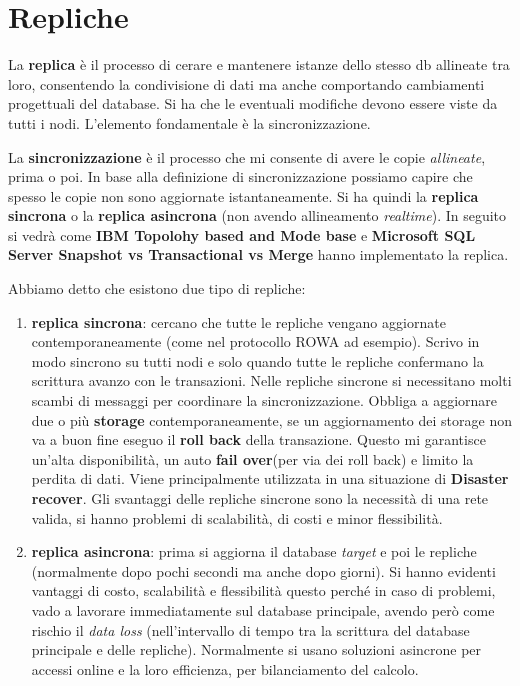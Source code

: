 \section{Repliche}
La \textbf{replica} è il processo di cerare e mantenere istanze dello stesso db allineate tra loro, consentendo la condivisione di dati ma anche comportando cambiamenti progettuali del database. Si ha che le eventuali modifiche devono essere viste da tutti i nodi. L'elemento fondamentale è la sincronizzazione.

La \textbf{sincronizzazione} è il processo che mi consente di avere le copie \textit{allineate}, prima o poi. In base alla definizione di sincronizzazione possiamo capire che spesso le copie non sono aggiornate istantaneamente. Si ha quindi la \textbf{replica sincrona} o la \textbf{replica asincrona} (non avendo allineamento \textit{realtime}). In seguito si vedrà come \textbf{IBM Topolohy based and Mode base} e \textbf{Microsoft SQL Server Snapshot vs Transactional vs Merge} hanno implementato la replica.

Abbiamo detto che esistono due tipo di repliche:
\begin{enumerate}
    \item \textbf{replica sincrona}: cercano che tutte le repliche vengano aggiornate contemporaneamente (come nel protocollo ROWA ad esempio). Scrivo in modo sincrono su tutti nodi e solo quando tutte le repliche confermano la scrittura avanzo con le transazioni. Nelle repliche sincrone si necessitano molti scambi di messaggi per coordinare la sincronizzazione. Obbliga a aggiornare due o più \textbf{storage} contemporaneamente, se un aggiornamento dei storage non va a buon fine eseguo il \textbf{roll back} della transazione. Questo mi garantisce un'alta disponibilità, un auto \textbf{fail over}(per via dei roll back) e limito la perdita di dati. Viene principalmente utilizzata in una situazione di \textbf{Disaster recover}. Gli svantaggi delle repliche sincrone sono la necessità di una rete valida, si hanno problemi di scalabilità, di costi e minor flessibilità.
    
    \item \textbf{replica asincrona}:  prima si aggiorna il database \textit{target} e poi le repliche (normalmente dopo pochi secondi ma anche dopo giorni). Si hanno evidenti vantaggi di costo, scalabilità e flessibilità questo perché in caso di problemi, vado a lavorare immediatamente sul database principale, avendo però come rischio il \textit{data loss} (nell'intervallo di tempo tra la scrittura del database principale e delle repliche). Normalmente si usano soluzioni asincrone per accessi online e la loro efficienza, per bilanciamento del calcolo.
\end{enumerate}

